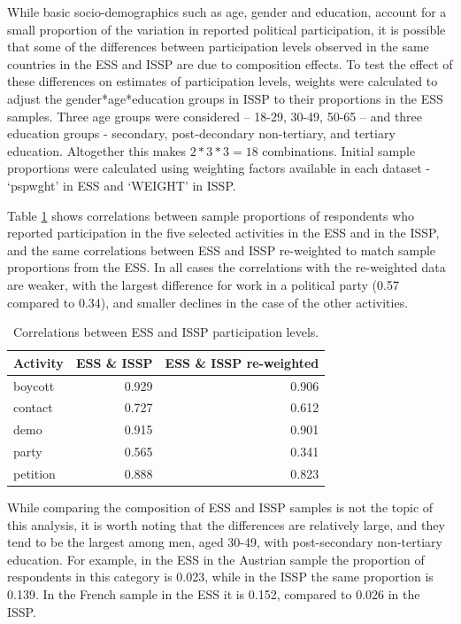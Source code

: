 \documentclass[12pt,]{article}
\begin{document}
While basic socio-demographics such as age, gender and education, account for a small proportion of the variation in reported political participation, it is possible that some of the differences between participation levels observed in the same countries in the ESS and ISSP are due to composition effects. To test the effect of these differences on estimates of participation levels, weights were calculated to adjust the gender*age*education groups in ISSP to their proportions in the ESS samples. Three age groups were considered -- 18-29, 30-49, 50-65 -- and three education groups - secondary, post-decondary non-tertiary, and tertiary education. Altogether this makes \(2*3*3=18\) combinations. Initial sample proportions were calculated using weighting factors available in each dataset - `pspwght' in ESS and `WEIGHT' in ISSP.

Table \ref{tab:sample-re-weighting} shows correlations between sample proportions of respondents who reported participation in the five selected activities in the ESS and in the ISSP, and the same correlations between ESS and ISSP re-weighted to match sample proportions from the ESS. In all cases the correlations with the re-weighted data are weaker, with the largest difference for work in a political party (0.57 compared to 0.34), and smaller declines in the case of the other activities.

\begin{table}[t]

\caption{\label{tab:sample-re-weighting}Correlations between ESS and ISSP participation levels.}
\centering
\fontsize{11}{13}\selectfont
\begin{tabular}{lrr}
\toprule
Activity & ESS \& ISSP & ESS \& ISSP re-weighted\\
\midrule
\rowcolor{gray!6}  boycott & 0.929 & 0.906\\
contact & 0.727 & 0.612\\
\rowcolor{gray!6}  demo & 0.915 & 0.901\\
party & 0.565 & 0.341\\
\rowcolor{gray!6}  petition & 0.888 & 0.823\\
\bottomrule
\end{tabular}
\end{table}

While comparing the composition of ESS and ISSP samples is not the topic of this analysis, it is worth noting that the differences are relatively large, and they tend to be the largest among men, aged 30-49, with post-secondary non-tertiary education. For example, in the ESS in the Austrian sample the proportion of respondents in this category is 0.023, while in the ISSP the same proportion is 0.139. In the French sample in the ESS it is 0.152, compared to 0.026 in the ISSP.
\end{document}

